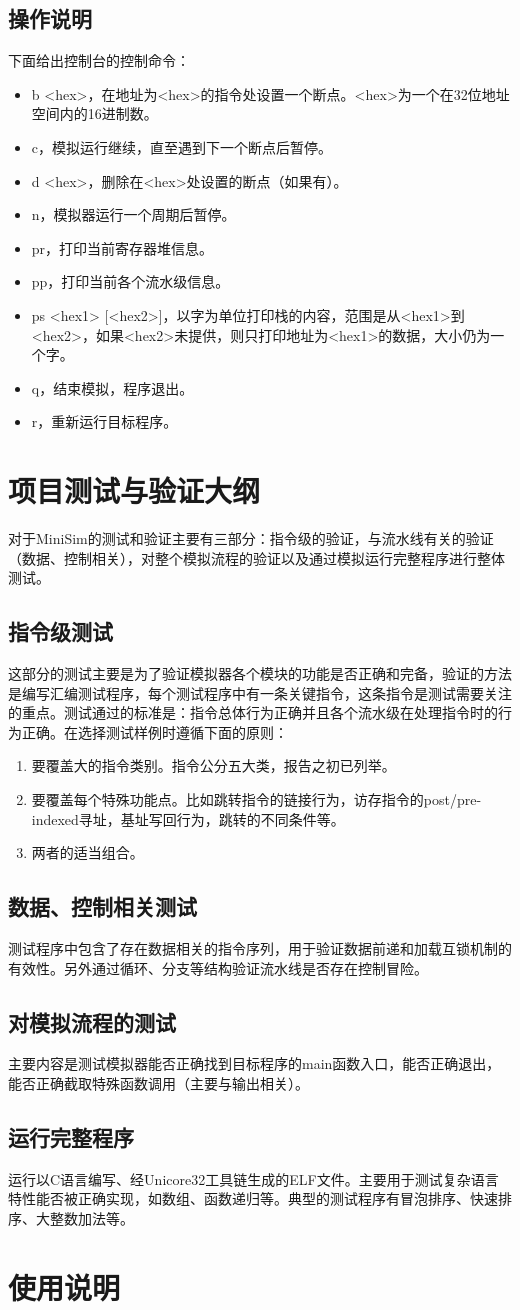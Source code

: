 \documentclass[12pt,a4paper,Flow]{report}
\begin{document}
\section{操作说明}
下面给出控制台的控制命令：
\begin{itemize}
\item b <hex>，在地址为<hex>的指令处设置一个断点。<hex>为一个在32位地址空间内的16进制数。
\item c，模拟运行继续，直至遇到下一个断点后暂停。
\item d <hex>，删除在<hex>处设置的断点（如果有）。
\item n，模拟器运行一个周期后暂停。
\item pr，打印当前寄存器堆信息。
\item pp，打印当前各个流水级信息。
\item ps <hex1> [<hex2>]，以字为单位打印栈的内容，范围是从<hex1>到<hex2>，如果<hex2>未提供，则只打印地址为<hex1>的数据，大小仍为一个字。
\item q，结束模拟，程序退出。
\item r，重新运行目标程序。
\end{itemize}
\chapter{项目测试与验证大纲}
对于MiniSim的测试和验证主要有三部分：指令级的验证，与流水线有关的验证（数据、控制相关），对整个模拟流程的验证以及通过模拟运行完整程序进行整体测试。
\section{指令级测试}
这部分的测试主要是为了验证模拟器各个模块的功能是否正确和完备，验证的方法是编写汇编测试程序，每个测试程序中有一条关键指令，这条指令是测试需要关注的重点。测试通过的标准是：指令总体行为正确并且各个流水级在处理指令时的行为正确。在选择测试样例时遵循下面的原则：
\begin{enumerate}
\item 要覆盖大的指令类别。指令公分五大类，报告之初已列举。
\item 要覆盖每个特殊功能点。比如跳转指令的链接行为，访存指令的post/pre-indexed寻址，基址写回行为，跳转的不同条件等。
\item 两者的适当组合。
\end{enumerate}
\section{数据、控制相关测试}
测试程序中包含了存在数据相关的指令序列，用于验证数据前递和加载互锁机制的有效性。另外通过循环、分支等结构验证流水线是否存在控制冒险。
\section{对模拟流程的测试}
主要内容是测试模拟器能否正确找到目标程序的main函数入口，能否正确退出，能否正确截取特殊函数调用（主要与输出相关）。
\section{运行完整程序}
运行以C语言编写、经Unicore32工具链生成的ELF文件。主要用于测试复杂语言特性能否被正确实现，如数组、函数递归等。典型的测试程序有冒泡排序、快速排序、大整数加法等。
\chapter{使用说明}
\end{document}
